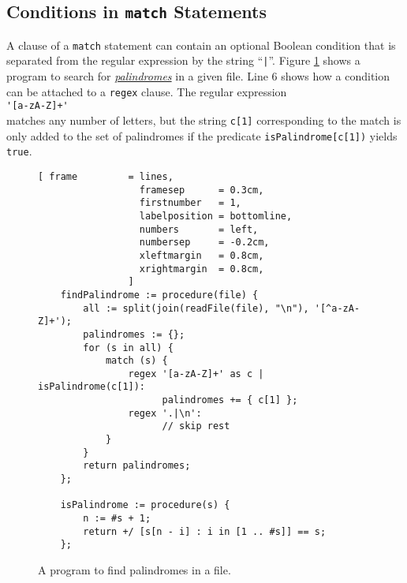 \subsection{Conditions in \texttt{match} Statements}
A clause of a \texttt{match} statement can contain an optional Boolean condition that is
separated from the regular expression by the string ``\texttt{|}''.   Figure
\ref{fig:find-palindrome.stlx} shows a program to search for 
\href{http://en.wikipedia.org/wiki/Palindrome}{\emph{palindromes}} 
in a given file.
Line 6 shows how a condition can be attached to a \texttt{regex} clause. The regular
expression 
\\[0.2cm]
\hspace*{1.3cm}
\verb|'[a-zA-Z]+'|
\\[0.2cm]
matches any number of letters, but the string \texttt{c[1]} corresponding to the match
is only added to the set of palindromes if the predicate \texttt{isPalindrome[c[1])} yields
\texttt{true}. 

\begin{figure}[!ht]
\centering
\begin{Verbatim}[ frame         = lines, 
                  framesep      = 0.3cm, 
                  firstnumber   = 1,
                  labelposition = bottomline,
                  numbers       = left,
                  numbersep     = -0.2cm,
                  xleftmargin   = 0.8cm,
                  xrightmargin  = 0.8cm,
                ]
    findPalindrome := procedure(file) {
        all := split(join(readFile(file), "\n"), '[^a-zA-Z]+');
        palindromes := {};
        for (s in all) {
            match (s) {
                regex '[a-zA-Z]+' as c | isPalindrome(c[1]): 
                      palindromes += { c[1] };
                regex '.|\n': 
                      // skip rest
            }
        }
        return palindromes;        
    };
    
    isPalindrome := procedure(s) {
        n := #s + 1;
        return +/ [s[n - i] : i in [1 .. #s]] == s;
    };
\end{Verbatim}
\vspace*{-0.3cm}
\caption{A program to find palindromes in a file.}
\label{fig:find-palindrome.stlx}
\end{figure}


